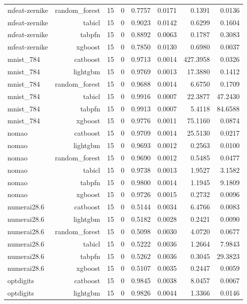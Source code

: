 \begin{table}[htbp]
\begin{tabular}{lrrrrrrr}
mfeat-zernike & random\_forest & 15 & 0 & 0.7757 & 0.0171 & 0.1391 & 0.0136 \\
mfeat-zernike & tabicl & 15 & 0 & 0.9023 & 0.0142 & 0.6299 & 0.1604 \\
mfeat-zernike & tabpfn & 15 & 0 & 0.8892 & 0.0063 & 0.1787 & 0.3083 \\
mfeat-zernike & xgboost & 15 & 0 & 0.7850 & 0.0130 & 0.6980 & 0.0037 \\
mnist\_784 & catboost & 15 & 0 & 0.9713 & 0.0014 & 427.3958 & 0.0326 \\
mnist\_784 & lightgbm & 15 & 0 & 0.9769 & 0.0013 & 17.3880 & 0.1412 \\
mnist\_784 & random\_forest & 15 & 0 & 0.9688 & 0.0014 & 6.6750 & 0.1709 \\
mnist\_784 & tabicl & 15 & 0 & 0.9916 & 0.0007 & 22.3877 & 47.2430 \\
mnist\_784 & tabpfn & 15 & 0 & 0.9913 & 0.0007 & 5.4118 & 84.6588 \\
mnist\_784 & xgboost & 15 & 0 & 0.9776 & 0.0011 & 75.1160 & 0.0874 \\
nomao & catboost & 15 & 0 & 0.9709 & 0.0014 & 25.5130 & 0.0217 \\
nomao & lightgbm & 15 & 0 & 0.9693 & 0.0012 & 0.2563 & 0.0100 \\
nomao & random\_forest & 15 & 0 & 0.9690 & 0.0012 & 0.5485 & 0.0477 \\
nomao & tabicl & 15 & 0 & 0.9738 & 0.0013 & 1.9527 & 3.1582 \\
nomao & tabpfn & 15 & 0 & 0.9800 & 0.0014 & 1.1945 & 9.1809 \\
nomao & xgboost & 15 & 0 & 0.9726 & 0.0015 & 0.2732 & 0.0096 \\
numerai28.6 & catboost & 15 & 0 & 0.5144 & 0.0034 & 6.4766 & 0.0083 \\
numerai28.6 & lightgbm & 15 & 0 & 0.5182 & 0.0028 & 0.2421 & 0.0090 \\
numerai28.6 & random\_forest & 15 & 0 & 0.5098 & 0.0030 & 4.0720 & 0.0677 \\
numerai28.6 & tabicl & 15 & 0 & 0.5222 & 0.0036 & 1.2664 & 7.9843 \\
numerai28.6 & tabpfn & 15 & 0 & 0.5262 & 0.0036 & 0.3045 & 29.3823 \\
numerai28.6 & xgboost & 15 & 0 & 0.5107 & 0.0035 & 0.2447 & 0.0059 \\
optdigits & catboost & 15 & 0 & 0.9845 & 0.0038 & 8.0457 & 0.0067 \\
optdigits & lightgbm & 15 & 0 & 0.9826 & 0.0044 & 1.3366 & 0.0146 \\

\end{tabular}
\end{table}
